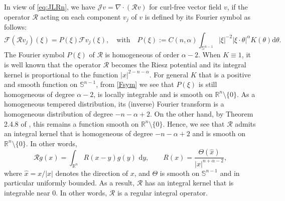 \documentclass[11pt,reqno]{amsart}
\theoremstyle{definition}
\theoremstyle{remark}
\numberwithin{equation}{section}
\def\upd{\mathrm{d}}
\newcommand{\R}{{\mathbb{R}}}
\begin{document}
In view of \eqref{eq:JLRn}, we have $\mathscr{J}v = \nabla \cdot (\mathcal{R}v)$ for curl-free vector field $v$, if the operator $\mathcal{R}$ acting on each component $v_j$ of $v$ is defined by its Fourier symbol as follows:
\begin{equation}\label{Fsym}
    \mathcal{F}(\mathcal{R}v_j)(\xi) = P(\xi) \mathcal{F}{v_j}(\xi), \quad \text{with} \quad P(\xi) := C(n,\alpha)\int_{\mathbb{S}^{n-1}}|\xi|^{-2}|\xi\cdot\theta|^{\alpha} K(\theta) \mathrm{d}\theta.
\end{equation}
The Fourier symbol $P(\xi)$ of $\mathcal{R}$ is homogeneous of order $\alpha-2$. When $K\equiv 1$, it is well known that the operator $\mathcal{R}$ becomes the Riesz potential and its integral kernel is proportional to the function $|x|^{2-n-\alpha}$. For general $K$ that is a positive and smooth function on $\mathbb{S}^{n-1}$, from \eqref{Fsym} we see that $P(\xi)$ is still homogeneous of degree $\alpha-2$, is locally integrable and is smooth on $\R^n\setminus \{0\}$. As a homogeneous tempered distribution, its (inverse) Fourier transform is a homogeneous distribution of degree $-n-\alpha+2$. On the other hand, by Theorem 2.4.8 of \cite{Grafakos2008}, this remains a function smooth on $\R^n\setminus \{0\}$. Hence, we see that $\mathcal{R}$ admits an integral kernel that is homogeneous of degree $-n-\alpha+2$ and is smooth on $\R^n\setminus \{0\}$. In other words, 
\begin{equation}
\label{eq:cRdef}
    \mathcal{R}g(x) = \int_{\R^n} R(x-y)g(y)\,\,\mathrm{d}y, \qquad R(x) = \frac{\Theta(\hat{x})}{|x|^{n+\alpha-2}},
\end{equation}
where $\hat{x} = x/|x|$ denotes the direction of $x$, and $\Theta$ is  smooth on $\mathbb{S}^{n-1}$ and in particular uniformly bounded. As a result, $\mathcal{R}$ has an integral kernel that is integrable near $0$. In other words, $\mathcal{R}$ is a regular integral operator.

\end{document}
